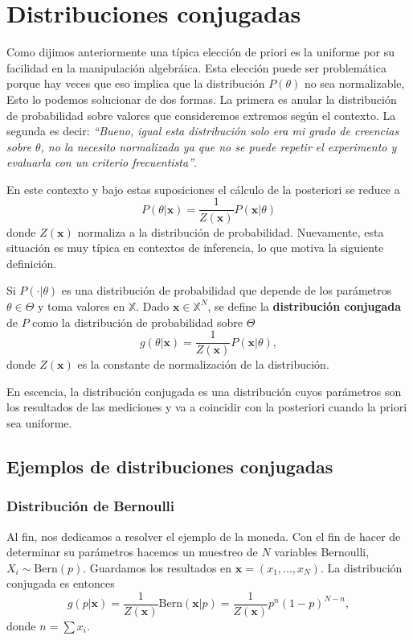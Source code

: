 \section{Distribuciones conjugadas}

Como dijimos anteriormente una típica elección de priori es la uniforme por su facilidad en la manipulación algebráica. Esta elección puede ser problemática porque hay veces que eso implica que la distribución $P(\theta)$ no sea normalizable, Esto lo podemos solucionar de dos formas. La primera es anular la distribución de probabilidad sobre valores que consideremos extremos según el contexto. La segunda es decir: {\it ``Bueno, igual esta distribución solo era mi grado de creencias sobre $\theta$, no la necesito normalizada ya que no se puede repetir el experimento y evaluarla con un criterio frecuentista''}.

En este contexto y bajo estas suposiciones el cálculo de la posteriori se reduce a 
\begin{equation}
    P(\theta|\mathbf{x}) = \frac{1}{Z(\mathbf{x})} P(\mathbf{x}|\theta)
\end{equation}
donde $Z(\mathbf{x})$ normaliza a la distribución de probabilidad. Nuevamente, esta situación es muy típica en contextos de inferencia, lo que motiva la siguiente definición.
\begin{definition}
    Si $P(\cdot|\theta)$ es una distribución de probabilidad que depende de los parámetros $\theta\in\Theta$ y toma valores en $\mathbb{X}$. Dado $\mathbf{x}\in \mathbb{X}^N$, se define la {\bf distribución conjugada} de $P$ como la distribución de probabilidad sobre $\Theta$
    \begin{equation}
        g(\theta|\mathbf{x}) = \frac{1}{Z(\mathbf{x})}P(\mathbf{x}|\theta),
    \end{equation}
    donde $Z(\mathbf{x})$ es la constante de normalización de la distribución.
\end{definition}
En escencia, la distribución conjugada es una distribución cuyos parámetros son los resultados de las mediciones y va a coincidir con la posteriori cuando la priori sea uniforme.
\subsection{Ejemplos de distribuciones conjugadas}
\subsubsection{Distribución de Bernoulli}
Al fin, nos dedicamos a resolver el ejemplo de la moneda.
Con el fin de hacer de determinar su parámetros hacemos un muestreo de $N$ variables Bernoulli, $X_i\sim \text{Bern}(p)$. Guardamos los resultados en $\mathbf{x}=(x_1,...,x_N)$. La distribución conjugada es entonces
\begin{equation}
    g(p|\mathbf{x}) = \frac{1}{Z(\mathbf{x})}\text{Bern}(\mathbf{x}|p) = \frac{1}{Z(\mathbf{x})}p^{n}(1-p)^{N-n},
\end{equation}
donde $n = \sum x_i$.

